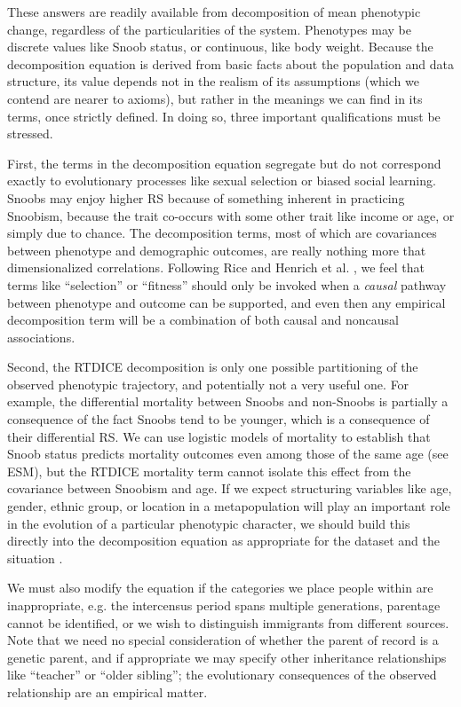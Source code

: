 \documentclass[11pt]{article}
\begin{document}
These answers are readily available from decomposition of mean phenotypic change, regardless of the particularities of the system.  Phenotypes may be discrete values like Snoob status, or continuous, like body weight.  Because the decomposition equation is derived from basic facts about the population and data structure, its value depends not in the realism of its assumptions (which we contend are nearer to axioms), but rather in the meanings we can find in its terms, once strictly defined.  In doing so, three important qualifications must be stressed. 

First, the terms in the decomposition equation segregate but do not correspond exactly to evolutionary processes like sexual selection or biased social learning.  Snoobs may enjoy higher RS because of something inherent in practicing Snoobism, because the trait co-occurs with some other trait like income or age, or simply due to chance. The decomposition terms, most of which are covariances between phenotype and demographic outcomes, are really nothing more that dimensionalized correlations.  Following Rice \citeyearpar{rice2004evolutionary} and Henrich et al. \citeyearpar{henrich2008five}, we feel that terms like ``selection'' or ``fitness'' should only be invoked when a \textit{causal} pathway between phenotype and outcome can be supported, and even then any empirical decomposition term will be a combination of both causal and noncausal associations. 

Second, the RTDICE decomposition is only one possible partitioning of the observed phenotypic trajectory, and potentially not a very useful one.  For example, the differential mortality between Snoobs and non-Snoobs is partially a consequence of the fact Snoobs tend to be younger, which is a consequence of their differential RS.  We can use logistic models of mortality to establish that Snoob status predicts mortality outcomes even among those of the same age (see ESM), but the RTDICE mortality term cannot isolate this effect from the covariance between Snoobism and age.  If we expect structuring variables like age, gender, ethnic group, or location in a metapopulation will play an important role in the evolution of a particular phenotypic character, we should build this directly into the decomposition equation as appropriate for the dataset and the situation \citep{coulson2008dynamics}.  

We must also modify the equation if the categories we place people within are inappropriate, e.g. the intercensus period spans multiple generations, parentage cannot be identified, or we wish to distinguish immigrants from different sources.  Note that we need no special consideration of whether the parent of record is a genetic parent, and if appropriate we may specify other inheritance relationships like ``teacher'' or ``older sibling''; the evolutionary consequences of the observed relationship are an empirical matter.
\end{document}
